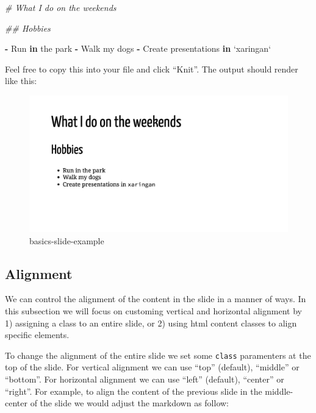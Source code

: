 \documentclass[
]{book}
\newenvironment{Shaded}{\begin{snugshade}}{\end{snugshade}}
\newcommand{\CommentTok}[1]{\textcolor[rgb]{0.37,0.37,0.37}{\textit{#1}}}
\newcommand{\ControlFlowTok}[1]{\textcolor[rgb]{0.27,0.27,0.27}{\textbf{#1}}}
\newcommand{\DataTypeTok}[1]{\textcolor[rgb]{0.27,0.27,0.27}{#1}}
\newcommand{\NormalTok}[1]{#1}
\newcommand{\OperatorTok}[1]{\textcolor[rgb]{0.43,0.43,0.43}{\textbf{#1}}}
\newcommand{\StringTok}[1]{\textcolor[rgb]{0.5,0.5,0.5}{#1}}
\begin{document}
\begin{Shaded}
\begin{Highlighting}[]
\CommentTok{# What I do on the weekends}

\CommentTok{## Hobbies}

\OperatorTok{-}\StringTok{ }\NormalTok{Run }\ControlFlowTok{in}\NormalTok{ the park}
\OperatorTok{-}\StringTok{ }\NormalTok{Walk my dogs}
\OperatorTok{-}\StringTok{ }\NormalTok{Create presentations }\ControlFlowTok{in} \StringTok{`}\DataTypeTok{xaringan}\StringTok{`}
\end{Highlighting}
\end{Shaded}

Feel free to copy this into your file and click ``Knit''. The output should render like this:

\begin{figure}
\centering
\includegraphics{img/02_basics-slide-example.png}
\caption{basics-slide-example}
\end{figure}

\hypertarget{alignment}{%
\subsection{Alignment}\label{alignment}}

We can control the alignment of the content in the slide in a manner of ways. In this subsection we will focus on customing vertical and horizontal alignment by 1) assigning a class to an entire slide, or 2) using html content classes to align specific elements.

To change the alignment of the entire slide we set some \texttt{class} paramenters at the top of the slide. For vertical alignment we can use ``top'' (default), ``middle'' or ``bottom''. For horizontal alignment we can use ``left'' (default), ``center'' or ``right''. For example, to align the content of the previous slide in the middle-center of the slide we would adjust the markdown as follow:
\end{document}
